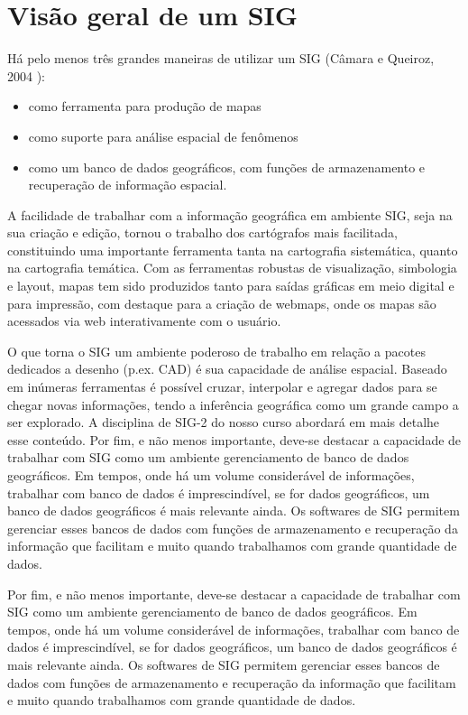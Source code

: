 \documentclass[
]{book}
\providecommand{\tightlist}{%
  \setlength{\itemsep}{0pt}\setlength{\parskip}{0pt}}
\begin{document}
\hypertarget{intro}{%
\chapter{Visão geral de um SIG}\label{intro}}

Há pelo menos três grandes maneiras de utilizar um SIG (Câmara e Queiroz, 2004 ):

\begin{itemize}
\tightlist
\item
  como ferramenta para produção de mapas
\item
  como suporte para análise espacial de fenômenos
\item
  como um banco de dados geográficos, com funções de armazenamento e recuperação de informação espacial.
\end{itemize}

A facilidade de trabalhar com a informação geográfica em ambiente SIG, seja na sua criação e edição, tornou o trabalho dos cartógrafos mais facilitada, constituindo uma importante ferramenta tanta na cartografia sistemática, quanto na cartografia temática. Com as ferramentas robustas de visualização, simbologia e layout, mapas tem sido produzidos tanto para saídas gráficas em meio digital e para impressão, com destaque para a criação de webmaps, onde os mapas são acessados via web interativamente com o usuário.

O que torna o SIG um ambiente poderoso de trabalho em relação a pacotes dedicados a desenho (p.ex. CAD) é sua capacidade de análise espacial. Baseado em inúmeras ferramentas é possível cruzar, interpolar e agregar dados para se chegar novas informações, tendo a inferência geográfica como um grande campo a ser explorado. A disciplina de SIG-2 do nosso curso abordará em mais detalhe esse conteúdo.
Por fim, e não menos importante, deve-se destacar a capacidade de trabalhar com SIG como um ambiente gerenciamento de banco de dados geográficos. Em tempos, onde há um volume considerável de informações, trabalhar com banco de dados é imprescindível, se for dados geográficos, um banco de dados geográficos é mais relevante ainda. Os softwares de SIG permitem gerenciar esses bancos de dados com funções de armazenamento e recuperação da informação que facilitam e muito quando trabalhamos com grande quantidade de dados.

Por fim, e não menos importante, deve-se destacar a capacidade de trabalhar com SIG como um ambiente gerenciamento de banco de dados geográficos. Em tempos, onde há um volume considerável de informações, trabalhar com banco de dados é imprescindível, se for dados geográficos, um banco de dados geográficos é mais relevante ainda. Os softwares de SIG permitem gerenciar esses bancos de dados com funções de armazenamento e recuperação da informação que facilitam e muito quando trabalhamos com grande quantidade de dados.
\end{document}
